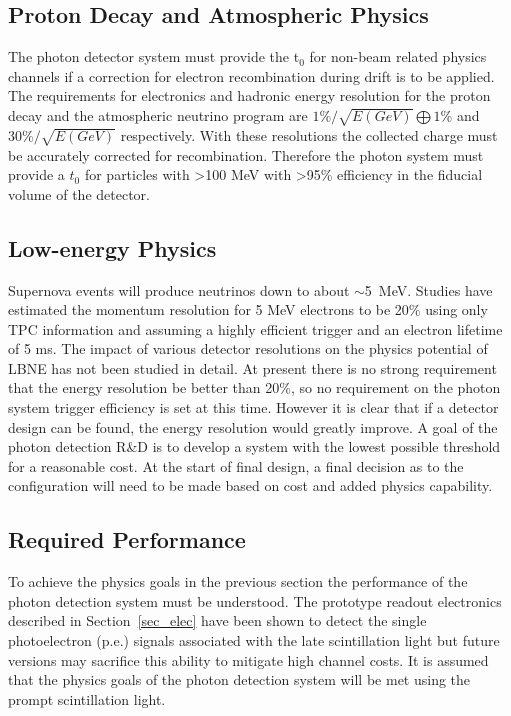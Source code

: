 \subsection{Proton Decay and Atmospheric Physics}

The photon detector system must provide the t$_0$ for non-beam related
physics channels if a correction for electron recombination during
drift is to be applied. The requirements for electronics and hadronic
energy resolution for the proton decay and the atmospheric neutrino
program are $1\% / \sqrt{E(GeV)} \bigoplus 1\%$ and $30\% /
\sqrt{E(GeV)}$ respectively. With these resolutions the collected
charge must be accurately corrected for recombination. Therefore the
photon system must provide a $t_{0}$ for particles with >100 MeV with
>95\% efficiency in the fiducial volume of the detector.

\subsection{Low-energy Physics}

Supernova events will produce neutrinos down to about
$\sim$5~MeV. Studies have estimated the momentum resolution for 5 MeV
electrons to be 20\% using only TPC information and assuming a highly
efficient trigger and an electron lifetime of 5 ms. The impact of
various detector resolutions on the physics potential of LBNE has not
been studied in detail. At present there is no strong requirement that
the energy resolution %
be better than 20\%, so no requirement on
the photon system trigger efficiency is set at this time. However it
is clear that if a detector design can be found,  the energy resolution
would greatly improve. A goal of the photon detection R\&D is to
develop a system with the lowest possible threshold for a reasonable
cost. At the %
start of final design, a final decision as to the
configuration will need to be made based on cost and added physics
capability.

\subsection{Required Performance}

To achieve the physics goals in the previous section the performance
of the photon detection system must be understood. The prototype
readout electronics described in Section~\ref{sec_elec} have been
shown to detect the single photoelectron (p.e.) signals associated with the late
scintillation light but future versions may sacrifice this ability to
mitigate high channel costs. It is assumed that the physics goals of
the photon detection system will be met using the prompt
scintillation light.

